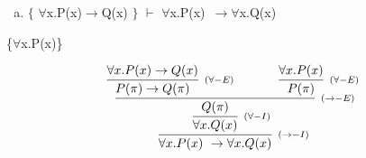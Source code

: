 \documentclass[aspectratio=43]{beamer}
\newcommand{\ria}{$\rightarrow$}
\newcommand{\fall}{$\forall$}
\begin{document}
     \begin{frame}[fragile]
    
    	\begin{enumerate}[f)]
			\item $\{$ \fall x.P(x)\ria Q(x) $\}$ $\vdash$ \fall x.P(x)\ \ria \fall x.Q(x) \\
		\end{enumerate}
        \{\fall x.P(x)\}
        \vspace{40pt}
        
        \[
        \begin{array}{c}
		
        	\infer[_{(\to -I)}]
            	{\forall x.P(x)\ \to \forall x.Q(x)}
            	{\infer[_{(\forall -I)}] 
                	{\forall x.Q(x)}
                    {\infer[_{(\to -E)}]
                    	{Q(\pi)}
                        {\infer[_{(\forall -E)}]
                        	{P(\pi)\rightarrow Q(\pi)}
                            {\forall x.P(x)\to Q(x)}
                        \hspace{35pt} 
                        \infer[_{(\forall -E)}] 
                        	{P(\pi)}
                            {\forall x.P(x)}
                        }
                    }
                 }   
        
		\end{array}
        \]
        
	\end{frame}
    
    
\end{document}
